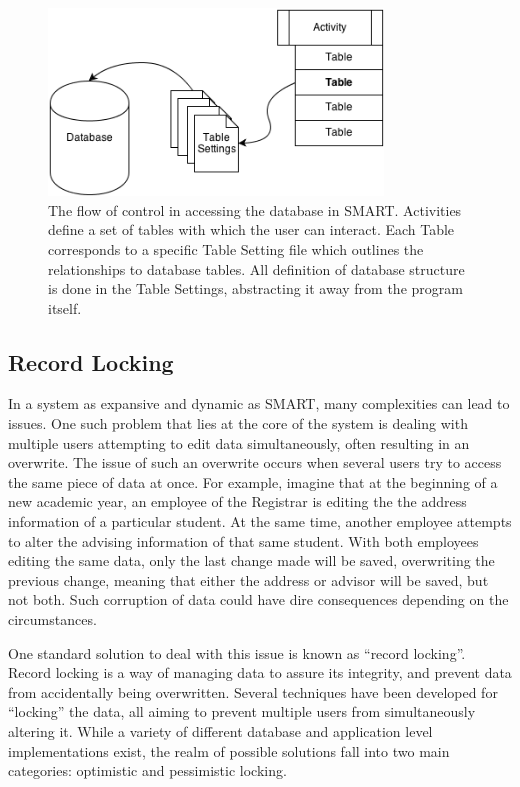 \documentclass[12pt]{article}
\begin{document}
\begin{figure}[h]
    \vspace{10pt}
    \begin{center}
        \centerline{\includegraphics[width=3.5in]{diagrams/SMARTAccess.png}}
    \end{center}
    \begin{spacing}{1.0}\caption{The flow of control in accessing the database in SMART. Activities define a set of tables with which the user can interact. Each Table corresponds to a specific Table Setting file which outlines the relationships to database tables. All definition of database structure is done in the Table Settings, abstracting it away from the program itself.}\end{spacing}
\end{figure}

\subsection{Record Locking}

In a system as expansive and dynamic as SMART, many complexities can lead to issues. One such problem that lies at the core of the system is dealing with multiple users attempting to edit data simultaneously, often resulting in an overwrite. The issue of such an overwrite occurs when several users try to access the same piece of data at once. For example, imagine that at the beginning of a new academic year, an employee of the Registrar is editing the the address information of a particular student. At the same time, another employee attempts to alter the advising information of that same student. With both employees editing the same data, only the last change made will be saved, overwriting the previous change, meaning that either the address or advisor will be saved, but not both. Such corruption of data could have dire consequences depending on the circumstances.  

One standard solution to deal with this issue is known as ``record locking''. Record locking is a way of managing data to assure its integrity, and prevent data from accidentally being overwritten. Several techniques have been developed for ``locking'' the data, all aiming to prevent multiple users from simultaneously altering it. While a variety of different database and application level implementations exist, the realm of possible solutions fall into two main categories: optimistic and pessimistic locking. 
\end{document}
